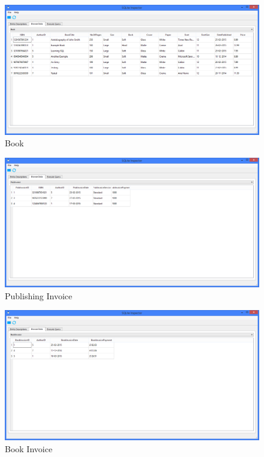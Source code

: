 \begin{figure}[H]
    \caption{Book} \label{fig:Book}
    \includegraphics[width=\textwidth]{./Maintenance/DatabaseTables/Book.png}
\end{figure}

\begin{figure}[H]
    \caption{Publishing Invoice} \label{fig:PubInvoice}
    \includegraphics[width=\textwidth]{./Maintenance/DatabaseTables/PubInvoice.png}
\end{figure}

\begin{figure}[H]
    \caption{Book Invoice} \label{fig:BookInvoice}
    \includegraphics[width=\textwidth]{./Maintenance/DatabaseTables/BookInvoice.png}
\end{figure}

